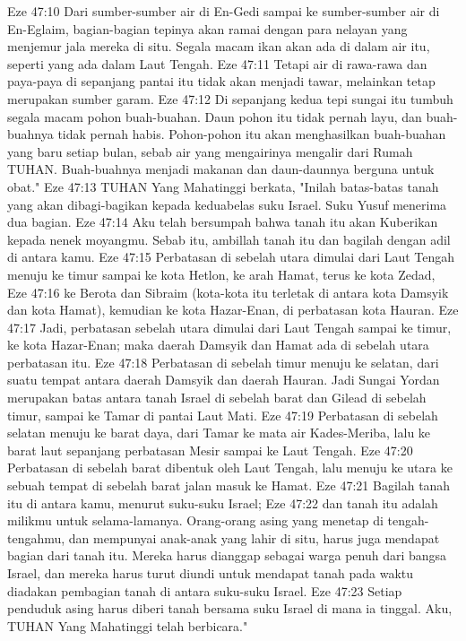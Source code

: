 Eze 47:10  Dari sumber-sumber air di En-Gedi sampai ke sumber-sumber air di En-Eglaim, bagian-bagian tepinya akan ramai dengan para nelayan yang menjemur jala mereka di situ. Segala macam ikan akan ada di dalam air itu, seperti yang ada dalam Laut Tengah.
Eze 47:11  Tetapi air di rawa-rawa dan paya-paya di sepanjang pantai itu tidak akan menjadi tawar, melainkan tetap merupakan sumber garam.
Eze 47:12  Di sepanjang kedua tepi sungai itu tumbuh segala macam pohon buah-buahan. Daun pohon itu tidak pernah layu, dan buah-buahnya tidak pernah habis. Pohon-pohon itu akan menghasilkan buah-buahan yang baru setiap bulan, sebab air yang mengairinya mengalir dari Rumah TUHAN. Buah-buahnya menjadi makanan dan daun-daunnya berguna untuk obat."
Eze 47:13  TUHAN Yang Mahatinggi berkata, "Inilah batas-batas tanah yang akan dibagi-bagikan kepada keduabelas suku Israel. Suku Yusuf menerima dua bagian.
Eze 47:14  Aku telah bersumpah bahwa tanah itu akan Kuberikan kepada nenek moyangmu. Sebab itu, ambillah tanah itu dan bagilah dengan adil di antara kamu.
Eze 47:15  Perbatasan di sebelah utara dimulai dari Laut Tengah menuju ke timur sampai ke kota Hetlon, ke arah Hamat, terus ke kota Zedad,
Eze 47:16  ke Berota dan Sibraim (kota-kota itu terletak di antara kota Damsyik dan kota Hamat), kemudian ke kota Hazar-Enan, di perbatasan kota Hauran.
Eze 47:17  Jadi, perbatasan sebelah utara dimulai dari Laut Tengah sampai ke timur, ke kota Hazar-Enan; maka daerah Damsyik dan Hamat ada di sebelah utara perbatasan itu.
Eze 47:18  Perbatasan di sebelah timur menuju ke selatan, dari suatu tempat antara daerah Damsyik dan daerah Hauran. Jadi Sungai Yordan merupakan batas antara tanah Israel di sebelah barat dan Gilead di sebelah timur, sampai ke Tamar di pantai Laut Mati.
Eze 47:19  Perbatasan di sebelah selatan menuju ke barat daya, dari Tamar ke mata air Kades-Meriba, lalu ke barat laut sepanjang perbatasan Mesir sampai ke Laut Tengah.
Eze 47:20  Perbatasan di sebelah barat dibentuk oleh Laut Tengah, lalu menuju ke utara ke sebuah tempat di sebelah barat jalan masuk ke Hamat.
Eze 47:21  Bagilah tanah itu di antara kamu, menurut suku-suku Israel;
Eze 47:22  dan tanah itu adalah milikmu untuk selama-lamanya. Orang-orang asing yang menetap di tengah-tengahmu, dan mempunyai anak-anak yang lahir di situ, harus juga mendapat bagian dari tanah itu. Mereka harus dianggap sebagai warga penuh dari bangsa Israel, dan mereka harus turut diundi untuk mendapat tanah pada waktu diadakan pembagian tanah di antara suku-suku Israel.
Eze 47:23  Setiap penduduk asing harus diberi tanah bersama suku Israel di mana ia tinggal. Aku, TUHAN Yang Mahatinggi telah berbicara."
